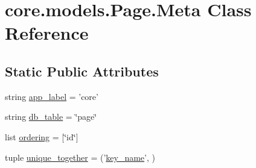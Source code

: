 \hypertarget{classcore_1_1models_1_1Page_1_1Meta}{\section{core.\-models.\-Page.\-Meta Class Reference}
\label{classcore_1_1models_1_1Page_1_1Meta}
}
\subsection*{Static Public Attributes}
\begin{DoxyCompactItemize}
\item 
string \hyperlink{classcore_1_1models_1_1Page_1_1Meta_a57b04d150a5126b25b5fa9f2ba2c445f}{app\-\_\-label} = 'core'
\item 
string \hyperlink{classcore_1_1models_1_1Page_1_1Meta_a6fa4bdea4de38b6d5022ac631e951815}{db\-\_\-table} = \char`\"{}page\char`\"{}
\item 
list \hyperlink{classcore_1_1models_1_1Page_1_1Meta_a6fc6e8d5355ce27608378e7c32732cb9}{ordering} = \mbox{[}\char`\"{}id\char`\"{}\mbox{]}
\item 
tuple \hyperlink{classcore_1_1models_1_1Page_1_1Meta_a2cbe9a4733715f0d91d839d47fab5f28}{unique\-\_\-together} = ('\hyperlink{classcore_1_1models_1_1Page_a25178e4dfd9fafc8e1e6dea92ed53471}{key\-\_\-name}', )
\end{DoxyCompactItemize}


